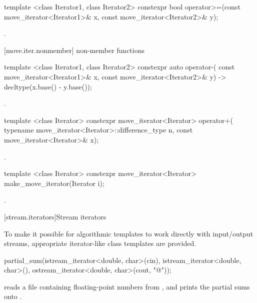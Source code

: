 %
\begin{itemdecl}
template <class Iterator1, class Iterator2>
constexpr bool operator>=(const move_iterator<Iterator1>& x, const move_iterator<Iterator2>& y);
\end{itemdecl}

\begin{itemdescr}
\pnum
\returns {}.
\end{itemdescr}

[move.iter.nonmember]{ non-member functions}

%
\begin{itemdecl}
template <class Iterator1, class Iterator2>
    constexpr auto operator-(
    const move_iterator<Iterator1>& x,
    const move_iterator<Iterator2>& y) -> decltype(x.base() - y.base());
\end{itemdecl}

\begin{itemdescr}
\pnum
\returns {}.
\end{itemdescr}

%
\begin{itemdecl}
template <class Iterator>
  constexpr move_iterator<Iterator> operator+(
    typename move_iterator<Iterator>::difference_type n, const move_iterator<Iterator>& x);
\end{itemdecl}

\begin{itemdescr}
\pnum
\returns {}.
\end{itemdescr}

%
\begin{itemdecl}
template <class Iterator>
constexpr move_iterator<Iterator> make_move_iterator(Iterator i);
\end{itemdecl}

\begin{itemdescr}
\pnum
\returns {}.
\end{itemdescr}

[stream.iterators]{Stream iterators}

\pnum
To make it possible for algorithmic templates to work directly with input/output streams, appropriate
iterator-like
class templates
are provided.

\begin{example}
\begin{codeblock}
partial_sum(istream_iterator<double, char>(cin),
  istream_iterator<double, char>(),
  ostream_iterator<double, char>(cout, "@\textbackslash@n"));
\end{codeblock}

reads a file containing floating-point numbers from
,
and prints the partial sums onto
.
\end{example}

